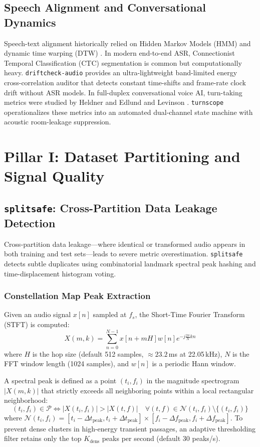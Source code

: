 \documentclass[10pt,journal,compsoc]{IEEEtran}
\begin{document}
\subsection{Speech Alignment and Conversational Dynamics}
Speech-text alignment historically relied on Hidden Markov Models (HMM) and dynamic time warping (DTW) \cite{malofr2022segmentation}. In modern end-to-end ASR, Connectionist Temporal Classification (CTC) segmentation \cite{kurzinger2020ctc} is common but computationally heavy. \texttt{driftcheck-audio} provides an ultra-lightweight band-limited energy cross-correlation auditor that detects constant time-shifts and frame-rate clock drift without ASR models. In full-duplex conversational voice AI, turn-taking metrics were studied by Heldner and Edlund \cite{heldner2010pauses} and Levinson \cite{levinson2016turn}. \texttt{turnscope} operationalizes these metrics into an automated dual-channel state machine with acoustic room-leakage suppression.

\section{Pillar I: Dataset Partitioning and Signal Quality}

\subsection{\texttt{splitsafe}: Cross-Partition Data Leakage Detection}
Cross-partition data leakage—where identical or transformed audio appears in both training and test sets—leads to severe metric overestimation. \texttt{splitsafe} detects subtle duplicates using combinatorial landmark spectral peak hashing and time-displacement histogram voting.

\subsubsection{Constellation Map Peak Extraction}
Given an audio signal $x[n]$ sampled at $f_s$, the Short-Time Fourier Transform (STFT) is computed:
\begin{equation}
X(m, k) = \sum_{n=0}^{N-1} x[n + mH] w[n] e^{-j \frac{2\pi}{N} k n}
\label{eq:stft}
\end{equation}
where $H$ is the hop size (default 512 samples, $\approx 23.2$\,ms at 22.05\,kHz), $N$ is the FFT window length (1024 samples), and $w[n]$ is a periodic Hann window.

A spectral peak is defined as a point $(t_i, f_i)$ in the magnitude spectrogram $|X(m, k)|$ that strictly exceeds all neighboring points within a local rectangular neighborhood:
\begin{equation}
(t_i, f_i) \in \mathcal{P} \iff |X(t_i, f_i)| > |X(t, f)| \quad \forall (t, f) \in \mathcal{N}(t_i, f_i) \setminus \{(t_i, f_i)\}
\label{eq:peak}
\end{equation}
where $\mathcal{N}(t_i, f_i) = [t_i - \Delta t_{\text{peak}}, t_i + \Delta t_{\text{peak}}] \times [f_i - \Delta f_{\text{peak}}, f_i + \Delta f_{\text{peak}}]$. To prevent dense clusters in high-energy transient passages, an adaptive thresholding filter retains only the top $K_{\text{dens}}$ peaks per second (default 30 peaks/s).
\end{document}
